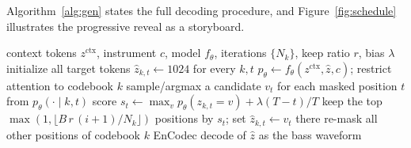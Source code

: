 \documentclass{article}
\begin{document}
Algorithm~\ref{alg:gen} states the full decoding procedure, and Figure~\ref{fig:schedule} illustrates the progressive reveal as a storyboard.

\begin{algorithm}[t]
\caption{Iterative coarse-to-fine mask-predict generation}
\label{alg:gen}
\begin{algorithmic}[1]
\Require context tokens $z^{\mathrm{ctx}}$, instrument $c$, model $f_\theta$, iterations $\{N_k\}$, keep ratio $r$, bias $\lambda$
\State initialize all target tokens $\hat{z}_{k,t} \gets 1024$ for every $k,t$
 
    \State $p_\theta \gets f_\theta(z^{\mathrm{ctx}}, \hat{z}, c)$; restrict attention to codebook $k$
    \State sample/argmax a candidate $v_t$ for each masked position $t$ from $p_\theta(\cdot\mid k,t)$
    \State score $s_t \gets \max_v p_\theta(z_{k,t}=v) + \lambda (T-t)/T$
    \State keep the top $\max(1, \lfloor B\, r\,(i{+}1)/N_k\rfloor)$ positions by $s_t$; set $\hat{z}_{k,t}\!\gets\! v_t$ there
    \State re-mask all other positions of codebook $k$
  \EndFor
\EndFor
\State \Return EnCodec decode of $\hat{z}$ as the bass waveform
\end{algorithmic}
\end{algorithm}
\end{document}
